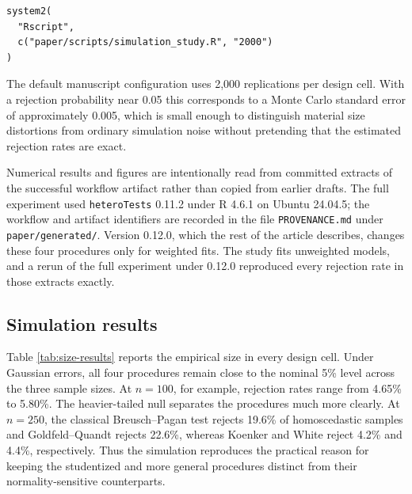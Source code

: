 \begin{verbatim}
system2(
  "Rscript",
  c("paper/scripts/simulation_study.R", "2000")
)
\end{verbatim}

The default manuscript configuration uses 2,000 replications per design cell.
With a rejection probability near 0.05 this corresponds to a Monte Carlo
standard error of approximately 0.005, which is small enough to distinguish
material size distortions from ordinary simulation noise without pretending
that the estimated rejection rates are exact.

Numerical results and figures are intentionally read from committed extracts of
the successful workflow artifact rather than copied from earlier drafts. The
full experiment used \texttt{heteroTests} 0.11.2 under R 4.6.1 on Ubuntu 24.04.5;
the workflow and artifact identifiers are recorded in the file
\texttt{PROVENANCE.md} under \texttt{paper/generated/}. Version 0.12.0, which the rest of
the article
describes, changes these four procedures only for weighted fits. The study
fits unweighted models, and a rerun of the full experiment under 0.12.0
reproduced every rejection rate in those extracts exactly.

\subsection{Simulation results}\label{simulation-results}

Table \ref{tab:size-results} reports the empirical size in every design cell.
Under Gaussian errors, all four procedures remain close to the nominal 5\%
level across the three sample sizes. At \(n=100\), for example, rejection
rates range from
4.65\%
to
5.80\%.
The heavier-tailed null separates the procedures much more clearly. At
\(n=250\), the classical Breusch--Pagan test rejects
19.6\%
of homoscedastic samples and Goldfeld--Quandt rejects
22.6\%,
whereas Koenker and White reject
4.2\%
and
4.4\%,
respectively. Thus the simulation reproduces the practical reason for keeping
the studentized and more general procedures distinct from their
normality-sensitive counterparts.

